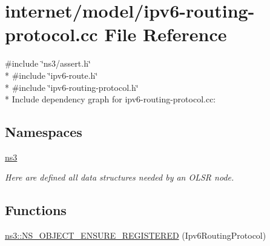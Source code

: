 \hypertarget{ipv6-routing-protocol_8cc}{}\section{internet/model/ipv6-\/routing-\/protocol.cc File Reference}
\label{ipv6-routing-protocol_8cc}
{\ttfamily \#include \char`\"{}ns3/assert.\+h\char`\"{}}\\*
{\ttfamily \#include \char`\"{}ipv6-\/route.\+h\char`\"{}}\\*
{\ttfamily \#include \char`\"{}ipv6-\/routing-\/protocol.\+h\char`\"{}}\\*
Include dependency graph for ipv6-\/routing-\/protocol.cc\+:
\subsection*{Namespaces}
\begin{DoxyCompactItemize}
\item 
 \hyperlink{namespacens3}{ns3}
\begin{DoxyCompactList}\small\item\em Here are defined all data structures needed by an O\+L\+SR node. \end{DoxyCompactList}\end{DoxyCompactItemize}
\subsection*{Functions}
\begin{DoxyCompactItemize}
\item 
\hyperlink{namespacens3_a90d497920d7da8b237a82e8a2742780e}{ns3\+::\+N\+S\+\_\+\+O\+B\+J\+E\+C\+T\+\_\+\+E\+N\+S\+U\+R\+E\+\_\+\+R\+E\+G\+I\+S\+T\+E\+R\+ED} (Ipv6\+Routing\+Protocol)
\end{DoxyCompactItemize}
